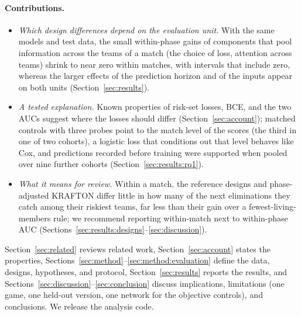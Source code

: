 \documentclass[sigconf,anonymous]{acmart}
\begin{document}
\paragraph{Contributions.}
\begin{itemize}
\item \emph{Which design differences depend on the evaluation unit.} With the same models and test data, the small within-phase gains of components that pool information across the teams of a match (the choice of loss, attention across teams) shrink to near zero within matches, with intervals that include zero, whereas the larger effects of the prediction horizon and of the inputs appear on both units (Section~\ref{sec:results}).
\item \emph{A tested explanation.} Known properties of risk-set losses, BCE, and the two AUCs suggest where the losses should differ (Section~\ref{sec:account}); matched controls with three probes point to the match level of the scores (the third in one of two cohorts), a logistic loss that conditions out that level behaves like Cox, and predictions recorded before training were supported when pooled over nine further cohorts (Section~\ref{sec:results:rq1}).
\item \emph{What it means for review.} Within a match, the reference designs and phase-adjusted KRAFTON differ little in how many of the next eliminations they catch among their riskiest teams, far less than their gain over a fewest-living-members rule; we recommend reporting within-match next to within-phase AUC (Sections~\ref{sec:results:designs}--\ref{sec:discussion}).
\end{itemize}
Section~\ref{sec:related} reviews related work, Section~\ref{sec:account} states the properties, Sections~\ref{sec:method}--\ref{sec:method:evaluation} define the data, designs, hypotheses, and protocol, Section~\ref{sec:results} reports the results, and Sections~\ref{sec:discussion}--\ref{sec:conclusion} discuss implications, limitations (one game, one held-out version, one network for the objective controls), and conclusions. We release the analysis code.

\end{document}
